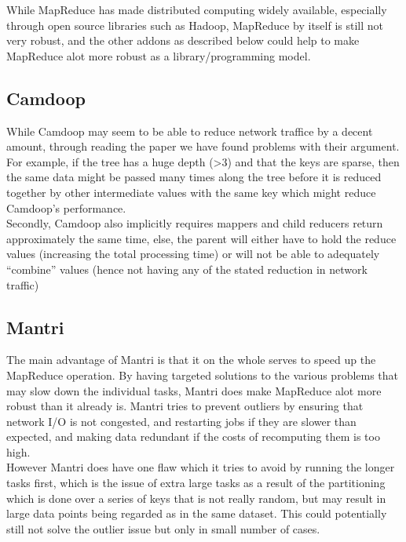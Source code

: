 \documentclass[]{article}
\begin{document}
While MapReduce has made distributed computing widely available, especially through open source libraries such as Hadoop, MapReduce by itself is still not very robust, and the other addons as described below could help to make MapReduce alot more robust as a library/programming model.\\

\subsection{Camdoop}
While Camdoop may seem to be able to reduce network traffice by a decent amount, through reading the paper we have found problems with their argument.\\

For example, if the tree has a huge depth (>3) and that the keys are sparse, then the same data might be passed many times along the tree before it is reduced together by other intermediate values with the same key which might reduce Camdoop’s performance.\\

Secondly, Camdoop also implicitly requires mappers and child reducers return approximately the same time, else, the parent will either have to hold the reduce values (increasing the total processing time) or will not be able to adequately ``combine'' values (hence not having any of the stated reduction in network traffic)\\

\subsection{Mantri}

The main advantage of Mantri is that it on the whole serves to speed up the MapReduce operation. By having targeted solutions to the various problems that may slow down the individual tasks, Mantri does make MapReduce alot more robust than it already is. Mantri tries to prevent outliers by ensuring that network I/O is not congested, and restarting jobs if they are slower than expected, and making data redundant if the costs of recomputing them is too high. \\

However Mantri does have one flaw which it tries to avoid by running the longer tasks first, which is the issue of extra large tasks as a result of the partitioning which is done over a series of keys that is not really random, but may result in large data points being regarded as in the same dataset. This could potentially still not solve the outlier issue but only in small number of cases.\\
\end{document}
